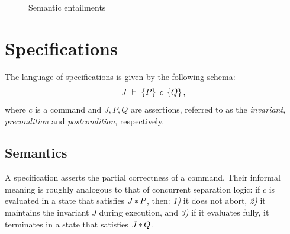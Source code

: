 \documentclass[11pt]{article}
\begin{document}
\begin{figure}[ht]
	\centering
	\caption{\label{fig:entailments}Semantic entailments}
\end{figure}


\section{Specifications}
\label{sec:specifications}

The language of specifications is given by the following schema: \[ J\;\vdash\;\left\lbrace P \right\rbrace\;c\;\left\lbrace Q \right\rbrace, \] where $c$ is a command and $J,P,Q$ are assertions, referred to as the \emph{invariant}, \emph{precondition} and \emph{postcondition}, respectively. 

\subsection{Semantics}
\label{specification-semantics}

A specification asserts the partial correctness of a command. Their informal meaning is roughly analogous to that of concurrent separation logic: if $c$ is evaluated in a state that satisfies $J \operatorname{\ast} P$, then: \emph{1)} it does not abort, \emph{2)} it maintains the invariant $J$ during execution, and \emph{3)} if it evaluates fully, it terminates in a state that satisfies $J \operatorname{\ast} Q$. 
\end{document}

